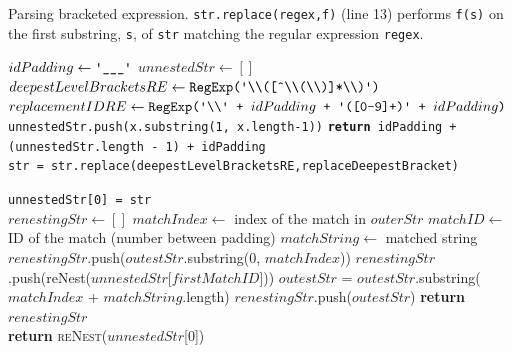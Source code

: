 \begin{algorithm}[!htp]
\caption{Parsing bracketed expression. \texttt{str.replace(regex,f)} (line 13) performs \texttt{f(s)} on the first substring, \texttt{s}, of \texttt{str} matching the regular expression \texttt{regex}.}
\label{alg:parenthesis}
\begin{algorithmic}[1]

   \State $idPadding\gets \texttt{\upquote{\_\_\_}}$
   \State $unnestedStr\gets []$
   \State $deepestLevelBracketsRE\gets \texttt{RegExp(\upquote{\textbackslash\textbackslash([\^{}\textbackslash\textbackslash(\textbackslash\textbackslash)]*\textbackslash\textbackslash)})}$
   \State $replacementIDRE\gets \texttt{RegExp(\upquote{\textbackslash\textbackslash} + }idPadding\texttt{ + \upquote{([0-9]+)} + }idPadding\texttt{)}$\\

     \State \texttt{unnestedStr.push(x.substring(1, x.length-1))}
     \State \texttt{\textbf{return} idPadding + (unnestedStr.length - 1) + idPadding}
   \EndProcedure \\

     \State \texttt{str = str.replace(deepestLevelBracketsRE,replaceDeepestBracket)}
   \EndWhile

   \State \texttt{unnestedStr[0] = str}\\

     \State $renestingStr\gets []$
       \State $matchIndex\gets$ index of the match in $outerStr$
       \State $matchID\gets$ ID of the match (number between padding)
       \State $matchString\gets$ matched string\\

				\State $renestingStr$.push($outestStr$.substring(0, $matchIndex$))
			\EndIf
			\State $renestingStr$.push(reNest($unnestedStr$[$firstMatchID$]))
			\State $outestStr$ = $outestStr$.substring($matchIndex$ + $matchString$.length)
     \EndWhile
     \State $renestingStr$.push($outestStr$)
     \State \textbf{return} $renestingStr$
   \EndProcedure \\

   \State \textbf{return} \textsc{reNest}($unnestedStr$[0])

\EndProcedure
\end{algorithmic}
\end{algorithm}


